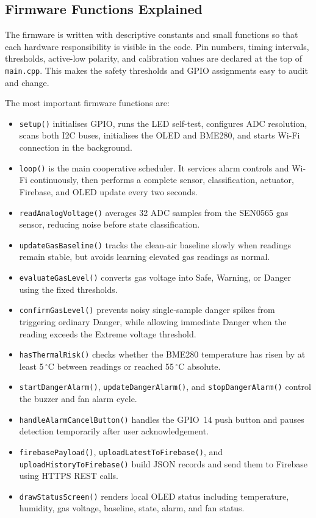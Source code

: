 \documentclass[a4paper,10pt,conference,onecolumn]{IEEEtran}
\begin{document}
\subsection{Firmware Functions Explained}

The firmware is written with descriptive constants and small functions so that
each hardware responsibility is visible in the code. Pin numbers, timing
intervals, thresholds, active-low polarity, and calibration values are declared
at the top of \texttt{main.cpp}. This makes the safety thresholds and GPIO
assignments easy to audit and change.

The most important firmware functions are:
\begin{itemize}
  \item \texttt{setup()} initialises GPIO, runs the LED self-test, configures
        ADC resolution, scans both I2C buses, initialises the OLED and BME280,
        and starts Wi-Fi connection in the background.
  \item \texttt{loop()} is the main cooperative scheduler. It services alarm
        controls and Wi-Fi continuously, then performs a complete sensor,
        classification, actuator, Firebase, and OLED update every two seconds.
  \item \texttt{readAnalogVoltage()} averages 32 ADC samples from the SEN0565
        gas sensor, reducing noise before state classification.
  \item \texttt{updateGasBaseline()} tracks the clean-air baseline slowly when
        readings remain stable, but avoids learning elevated gas readings as
        normal.
  \item \texttt{evaluateGasLevel()} converts gas voltage into Safe, Warning, or
        Danger using the fixed thresholds.
  \item \texttt{confirmGasLevel()} prevents noisy single-sample danger spikes
        from triggering ordinary Danger, while allowing immediate Danger when
        the reading exceeds the Extreme voltage threshold.
  \item \texttt{hasThermalRisk()} checks whether the BME280 temperature has
        risen by at least 5\,$^{\circ}$C between readings or reached
        55\,$^{\circ}$C absolute.
  \item \texttt{startDangerAlarm()}, \texttt{updateDangerAlarm()}, and
        \texttt{stopDangerAlarm()} control the buzzer and fan alarm cycle.
  \item \texttt{handleAlarmCancelButton()} handles the GPIO~14 push button and
        pauses detection temporarily after user acknowledgement.
  \item \texttt{firebasePayload()}, \texttt{uploadLatestToFirebase()}, and
        \texttt{uploadHistoryToFirebase()} build JSON records and send them to
        Firebase using HTTPS REST calls.
  \item \texttt{drawStatusScreen()} renders local OLED status including
        temperature, humidity, gas voltage, baseline, state, alarm, and fan
        status.
\end{itemize}
\end{document}
